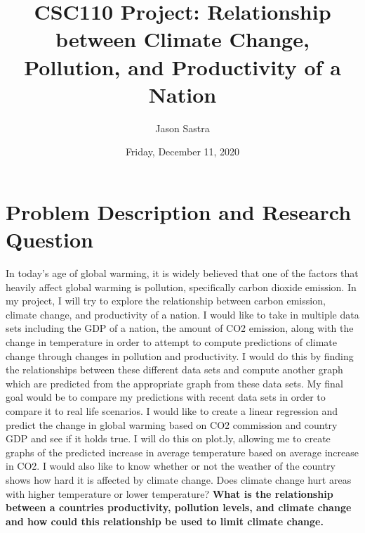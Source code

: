 \documentclass[fontsize=11pt]{article}
\title{CSC110 Project: Relationship between Climate Change, Pollution, and Productivity of a Nation}
\author{Jason Sastra}
\date{Friday, December 11, 2020}
\begin{document}
\maketitle

\section*{Problem Description and Research Question}
In today's age of global warming, it is widely believed that one of the factors that heavily affect global warming is pollution, specifically carbon dioxide emission. In my project, I will try to explore the relationship between carbon emission, climate change, and productivity of a nation. I would like to take in multiple data sets including the GDP of a nation, the amount of CO2 emission, along with the change in temperature in order to attempt to compute predictions of climate change through changes in pollution and productivity. I would do this by finding the relationships between these different data sets and compute another graph which are predicted from the appropriate graph from these data sets. My final goal would be to compare my predictions with recent data sets in order to compare it to real life scenarios. I would like to create a linear regression and predict the change in global warming based on CO2 commission and country GDP and see if it holds true. I will do this on plot.ly, allowing me to create graphs of the predicted increase in average temperature based on average increase in CO2. I would also like to know whether or not the weather of the country shows how hard it is affected by climate change. Does climate change hurt areas with higher temperature or lower temperature? \textbf{What is the relationship between a countries productivity, pollution levels, and climate change and how could this relationship be used to limit climate change.}
\end{document}
